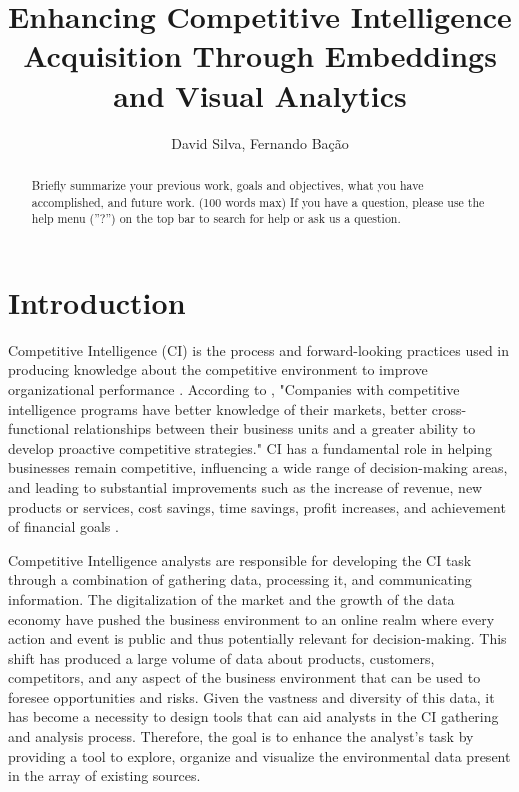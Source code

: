 \documentclass[a4paper]{article}
\title{Enhancing Competitive Intelligence Acquisition Through Embeddings and Visual Analytics}
\author{David Silva, Fernando Bação}
\date{}
\begin{document}
 
\maketitle

\begin{abstract}
	Briefly summarize your previous work, goals and objectives, what you have accomplished, and future work. (100 words max) If you have a question, please use the help menu (''?'') on the top bar to search for help or ask us a question.
\end{abstract}

\section{Introduction}
Competitive Intelligence (CI) is the process and forward-looking practices used in producing knowledge about the competitive environment to improve organizational performance \citet{madureira2021}. According to \citet{brod1999}, "Companies with competitive intelligence programs have better knowledge of their markets, better cross-functional relationships between their business units and a greater ability to develop proactive competitive strategies." CI has a fundamental role in helping businesses remain competitive, influencing a wide range of decision-making areas, and leading to substantial improvements such as the increase of revenue, new products or services, cost savings, time savings, profit increases, and achievement of financial goals \citep{calof2017}.

Competitive Intelligence analysts are responsible for developing the CI task through a combination of gathering data, processing it, and communicating information. The digitalization of the market and the growth of the data economy have pushed the business environment to an online realm where every action and event is public and thus potentially relevant for decision-making. This shift has produced a large volume of data about products, customers, competitors, and any aspect of the business environment that can be used to foresee opportunities and risks. Given the vastness and diversity of this data, it has become a necessity to design tools that can aid analysts in the CI gathering and analysis process. Therefore, the goal is to enhance the analyst's task by providing a tool to explore, organize and visualize the environmental data present in the array of existing sources.
\end{document}
